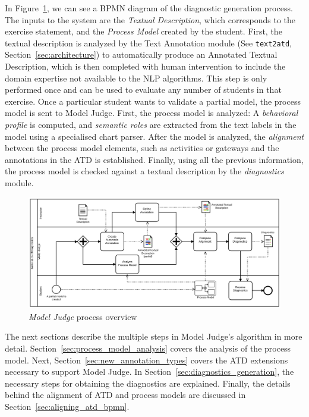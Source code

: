 In Figure~\ref{fig:modeljudge_overview}, we can see a BPMN diagram of the
diagnostic generation process. The inputs to the system are the \emph{Textual
  Description}, which corresponds to the exercise statement, and the
\emph{Process Model} created by the student. First, the textual description is
analyzed by the Text Annotation module (See \texttt{text2atd},
Section~\ref{sec:architecture}) to automatically produce an Annotated
Textual Description, which is then completed with human intervention to include
the domain expertise not available to the NLP algorithms. This step is only
performed once and can be used to evaluate any number of students in that
exercise. Once a particular student wants to validate a partial model, the
process model is sent to Model Judge. First, the process model is
analyzed: A \emph{behavioral profile} is computed, and \emph{semantic roles} are
extracted from the text labels in the model using a specialised chart parser.
After the model is analyzed, the \textit{alignment} between the process model
elements, such as activities or gateways and the annotations in the ATD is
established. Finally, using all the previous information, the process model is
checked against a textual description by the \emph{diagnostics} module.

\begin{figure}[htb]
  \centering
  \includegraphics[width=\textwidth]{figures/overview_bpmn}
  \caption{\emph{Model Judge} process overview}
  \label{fig:modeljudge_overview}
\end{figure}

The next sections describe the multiple steps in Model Judge's algorithm in more
detail. Section~\ref{sec:process_model_analysis} covers the analysis of the
process model. Next, Section~\ref{sec:new_annotation_types} covers the ATD
extensions necessary to support Model Judge. In
Section~\ref{sec:diagnostics_generation}, the necessary steps for obtaining the
diagnostics are explained. Finally, the details behind the alignment of ATD and
process models are discussed in Section~\ref{sec:aligning_atd_bpmn}. 

